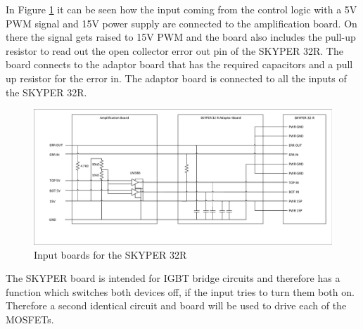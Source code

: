 In Figure \ref{fig:Skyper32in} it can be seen how the input coming from the control logic with a 5V PWM signal and 15V power supply are connected to the amplification board.
On there the signal gets raised to 15V PWM and the board also includes the pull-up resistor to read out the open collector error out pin of the SKYPER 32R.
The board connects to the adaptor board that has the required capacitors and a pull up resistor for the error in.
The adaptor board is connected to all the inputs of the SKYPER 32R.

\begin{figure}[H]
   \centering
   \includegraphics[width=\textwidth]{figures/Skyperboard/Skyper32in.pdf}
    \caption{Input boards for the SKYPER 32R}
	\label{fig:Skyper32in}
\end{figure}
The SKYPER board is intended for IGBT bridge circuits and therefore has a function which switches both devices off, if the input tries to turn them both on.\cite{SKYPER322:online} Therefore a second identical circuit and board will be used to drive each of the MOSFETs.

\clearpage